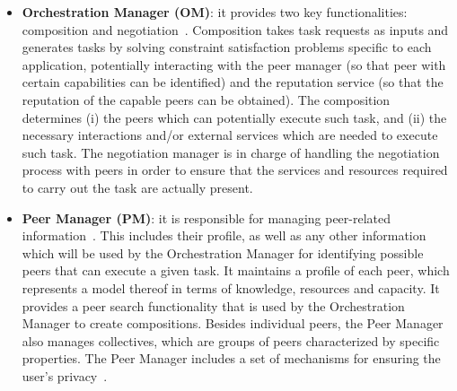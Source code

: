 \begin{itemize}

\item \textbf{Orchestration Manager (OM)}: it provides two key functionalities: composition and negotiation~\cite{D6.2}. Composition takes task requests as inputs and generates tasks by solving constraint satisfaction problems specific to each application, potentially interacting with the peer manager (so that peer with certain capabilities can be identified) and the reputation service (so that the reputation of the capable peers can be obtained). The composition determines (i) the peers which can potentially execute such task, and (ii) the necessary interactions and/or external services which are needed to execute such task.  The negotiation manager is in charge of handling the negotiation process with peers in order to ensure that the services and resources required to carry out the task are actually present. %

\item \textbf{Peer Manager (PM)}: it is responsible for managing peer-related information~\cite{D4.3}. This includes their profile, as well as any other information which will be used by the Orchestration Manager for identifying possible peers that can execute a given task.  It maintains a profile of each peer, which
represents a model thereof in terms of knowledge, resources and
capacity. It provides a peer search functionality that is used by the Orchestration Manager to create compositions. Besides individual peers, the Peer Manager also manages collectives, which are groups of peers characterized by specific properties. %
The Peer Manager includes a set of mechanisms for ensuring the user's privacy~\cite{D4.3}.


\end{itemize}
